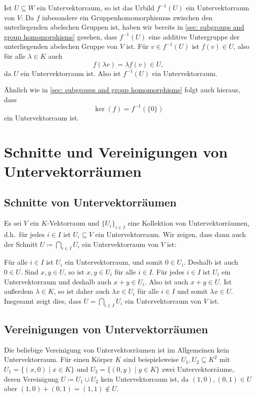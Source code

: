Ist $U \subseteq W$ ein Untervektorraum, so ist das Urbild $f^{-1}(U)$ ein Untervektorraum von $V$: Da $f$ inbesondere ein Gruppenhomomorphismus zwischen den unterliegenden abelschen Gruppen ist, haben wir bereits in \ref{sec: subgroups and group homomorphisms} gesehen, dass $f^{-1}(U)$ eine additive Untergruppe der unterliegenden abelschen Gruppe von $V$ ist. Für $v \in f^{-1}(U)$ ist $f(v) \in U$, also für alle $\lambda \in K$ auch
\[
 f(\lambda v) = \lambda f(v) \in U,
\]
da $U$ ein Untervektorraum ist. Also ist $f^{-1}(U)$ ein Untervektorraum.


\begin{bem}
 Ähnlich wie in \ref{sec: subgroups and group homomorphisms} folgt auch hieraus, dass
 \[
  \ker(f) = f^{-1}(\{0\})
 \]
 ein Untervektorraum ist.
\end{bem}





\section{Schnitte und Vereinigungen von Untervektorräumen}


\subsection{Schnitte von Untervektorräumen}
Es sei $V$ ein $K$-Vektorraum und $\{U_i\}_{i \in I}$ eine Kollektion von Untervektorräumen, d.h.\ für jedes $i \in I$ ist $U_i \subseteq V$ ein Untervektorraum. Wir zeigen, dass dann auch der Schnitt $U \coloneqq \bigcap_{i \in I} U_i$ ein Untervektorraum von $V$ ist:

Für alle $i \in I$ ist $U_i$ ein Untervektorraum, und somit $0 \in U_i$. Deshalb ist auch $0 \in U$. Sind $x,y \in U$, so ist $x,y \in U_i$ für alle $i \in I$. Für jedes $i \in I$ ist $U_i$ ein Untervektorraum und deshalb auch $x+y \in U_i$. Also ist auch $x+y \in U$. Ist außerdem $\lambda \in K$, so ist daher auch $\lambda x \in U_i$ für alle $i \in I$ und somit $\lambda x \in U$. Insgesamt zeigt dies, dass $U = \bigcap_{i \in I} U_i$ ein Untervektorraum von $V$ ist.


\subsection{Vereinigungen von Untervektorräumen}
Die beliebige Vereinigung von Untervektorräumen ist im Allgemeinen kein Untervektorraum. Für einen Körper $K$ sind beispielsweise $U_1, U_2 \subseteq K^2$ mit $U_1 = \{(x,0) \mid x \in K\}$ und $U_2 = \{(0,y) \mid y \in K\}$ zwei Untervektorräume, deren Vereinigung $U \coloneqq U_1 \cup U_2$ kein Untervektorraum ist, da $(1,0), (0,1) \in U$ aber $(1,0)+(0,1) = (1,1) \notin U$.

